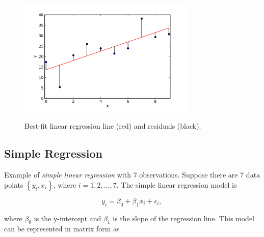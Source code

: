 \begin{figure}
  \centering
  \includegraphics[width=0.75\textwidth]{../Images/residuals_linreg.png}\\
  \caption{Best-fit linear regression line (red) and residuals (black). }\label{fig:residuals}
\end{figure}

\subsection{Simple Regression}
Example of \emph{simple linear regression} with 7 observations.
Suppose there are 7 data points $\left\{ {{y_i},{x_i}} \right\}$, where $i=1,2,…,7$. The simple linear regression model is

\begin{equation}
  y_i = \beta_0 + \beta_1 x_i +\epsilon_i, \,
\end{equation}

where $\beta_0$ is the y-intercept and $\beta_1$ is the slope of the regression line. This model can be represented in matrix form as

